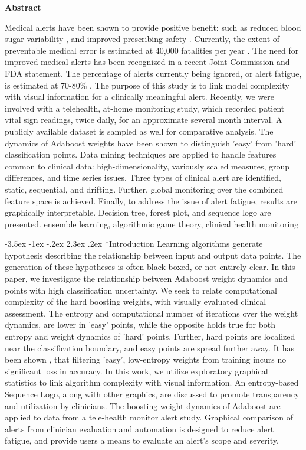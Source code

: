\documentclass[12pt]{article}
\makeatletter
\renewcommand\section{\@startsection{section}{1}{\z@}%
                                  {-3.5ex \@plus -1ex \@minus -.2ex}%
                                  {2.3ex \@plus.2ex}%
                                  {\normalfont\bfseries}}
\makeatother
\begin{document}
\begin{center}
    {\bf Abstract}\\
\end{center}
\noindent
Medical alerts have been shown to provide positive benefit: such as reduced blood sugar variability \cite{Mastro}, and improved prescribing safety \cite{Raebel}.  Currently, the extent of preventable medical error is estimated at 40,000 fatalities per year \cite{Muse}.  The need for improved medical alerts has been recognized in a recent Joint Commission and FDA statement.  The percentage of alerts currently being ignored, or alert fatigue, is estimated at 70-80\% \cite{Gouveia}.  The purpose of this study is to link model complexity with visual information for a clinically meaningful alert.  Recently, we were involved with a telehealth, at-home monitoring study, which recorded patient vital sign readings, twice daily, for an approximate several month interval.  A publicly available dataset is sampled as well for comparative analysis.  The dynamics of Adaboost weights have been shown to distinguish 'easy' from 'hard' classification points\cite{Capri2002}.  Data mining techniques are applied to handle features common to clinical data: high-dimensionality, variously scaled measures, group differences, and time series issues.  Three types of clinical alert are identified, static, sequential, and drifting.  Further, global monitoring over the combined feature space is achieved.  Finally, to address the issue of alert fatigue, results are graphically interpretable.  Decision tree, forest plot, and sequence logo are presented. 
 ensemble learning, algorithmic game theory, clinical health monitoring

 
\section*{Introduction}
Learning algorithms generate hypothesis describing the relationship between input and output data points.  The generation of these hypotheses is often black-boxed, or not entirely clear.  In this paper, we investigate the relationship between Adaboost weight dynamics and points with high classification uncertainty.  We seek to relate computational complexity of the hard boosting weights, with visually evaluated clinical assessment.  The entropy and computational number of iterations over the weight dynamics, are lower in 'easy' points, while the opposite holds true for both entropy and weight dynamics of 'hard' points.  Further, hard points are localized near the classification boundary, and easy points are spread further away.  It has been shown \cite{Capri2002}, that filtering 'easy', low-entropy weights from training incurs no significant loss in accuracy.  In this work, we utilize exploratory graphical statistics to link algorithm complexity with visual information.  An entropy-based Sequence Logo, along with other graphics, are discussed to promote transparency and utilization by clinicians.  The boosting weight dynamics of Adaboost are applied to data from a tele-health monitor alert study.  Graphical comparison of alerts from clinician evaluation and automation is designed to reduce alert fatigue, and provide users a means to evaluate an alert's scope and severity.
\end{document}
